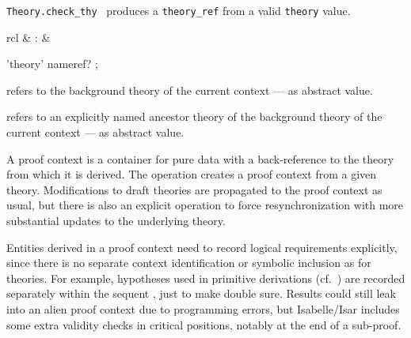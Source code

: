 \begin{isabellebody}
\begin{isamarkuptext}
\begin{description}
  \item \verb|Theory.check_thy|~ produces a \verb|theory_ref| from a valid \verb|theory| value.

  \end{description}%
\end{isamarkuptext}%
\isamarkuptrue%
%
\endisatagmlref
{\isafoldmlref}%
%
\isadelimmlref
%
\endisadelimmlref
%
\isadelimmlantiq
%
\endisadelimmlantiq
%
\isatagmlantiq
%
\begin{isamarkuptext}%
\begin{matharray}{rcl}
  \hypertarget{ML antiquotation.theory}{\hyperlink{ML antiquotation.theory}{\mbox{}}} & : &  \\
  \end{matharray}

  \begin{rail}
  'theory' nameref?
  ;
  \end{rail}

  \begin{description}

  \item {} refers to the background theory of the
  current context --- as abstract value.

  \item {} refers to an explicitly named ancestor
  theory  of the background theory of the current context
  --- as abstract value.

  \end{description}%
\end{isamarkuptext}%
\isamarkuptrue%
%
\endisatagmlantiq
{\isafoldmlantiq}%
%
\isadelimmlantiq
%
\endisadelimmlantiq
%
\isamarkuptrue%
%
\begin{isamarkuptext}%
A proof context is a container for pure data with a
  back-reference to the theory from which it is derived.  The  operation creates a proof context from a given theory.
  Modifications to draft theories are propagated to the proof context
  as usual, but there is also an explicit  operation
  to force resynchronization with more substantial updates to the
  underlying theory.

  Entities derived in a proof context need to record logical
  requirements explicitly, since there is no separate context
  identification or symbolic inclusion as for theories.  For example,
  hypotheses used in primitive derivations (cf.\ )
  are recorded separately within the sequent \isa{{\isasymGamma}\ {\isasymturnstile}\ {\isasymphi}}, just to
  make double sure.  Results could still leak into an alien proof
  context due to programming errors, but Isabelle/Isar includes some
  extra validity checks in critical positions, notably at the end of a
  sub-proof.


\end{isamarkuptext}
\end{isabellebody}
